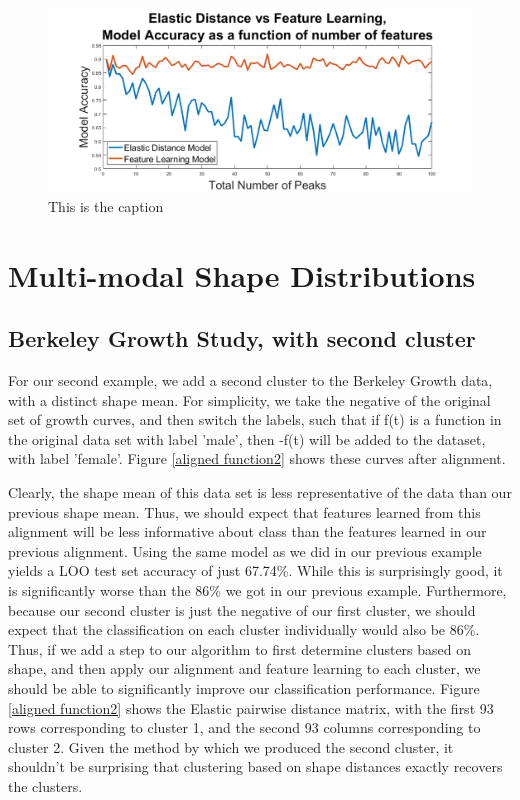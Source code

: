 \documentclass[]{article}
\begin{document}
	\begin{figure}
		\includegraphics[width = \linewidth]{./simulated_model_compare.png}
		\caption{This is the caption}
		\label{simulated data compare}
	\end{figure}



\section{Multi-modal Shape Distributions}

\subsection{Berkeley Growth Study, with second cluster}

For our second example, we add a second cluster to the Berkeley Growth data, with a distinct shape mean. For simplicity, we take the negative of the original set of growth curves, and then switch the labels, such that if f(t) is a function in the original data set with label 'male', then -f(t) will be added to the dataset, with label 'female'. Figure \ref{aligned function2} shows these curves after alignment. 

Clearly, the shape mean of this data set is less representative of the data than our previous shape mean. Thus, we should expect that features learned from this alignment will be less informative about class than the features learned in our previous alignment. Using the same model as we did in our previous example yields a LOO test set accuracy of just 67.74\%. While this is surprisingly good, it is significantly worse than the 86\% we got in our previous example. Furthermore, because our second cluster is just the negative of our first cluster, we should expect that the classification on each cluster individually would also be 86\%. Thus, if we add a step to our algorithm to first determine clusters based on shape, and then apply our alignment and feature learning to each cluster, we should be able to significantly improve our classification performance. Figure \ref{aligned function2} shows the Elastic pairwise distance matrix, with the first 93 rows corresponding to cluster 1, and the second 93 columns corresponding to cluster 2. Given the method by which we produced the second cluster, it shouldn't be surprising that clustering based on shape distances exactly recovers the clusters. \\
\end{document}
